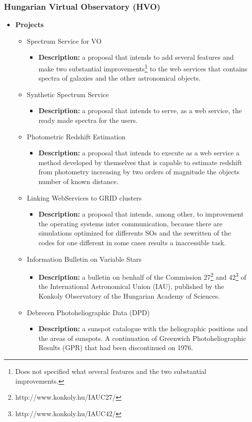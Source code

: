 \subsubsection{Hungarian Virtual Observatory \cite{website:hvo-home} (HVO)}

\begin{itemize}
\item \textbf{Projects}
\begin{itemize}
\item Spectrum Service for VO
\begin{itemize}
\item \textbf{Description:} a proposal that intends to add several features and
make two substantial improvements\footnote{Does not specified what several
features and the two substantial improvements.} to the web services that
contains spectra of galaxies and the other astronomical objects. 
\end{itemize}
\item Synthetic Spectrum Service
\begin{itemize}
\item \textbf{Description:} a proposal that intends to serve, as a web service,
the ready made spectra for the users.
\end{itemize}
\item Photometric Redshift Estimation
\begin{itemize}
\item \textbf{Description:} a proposal that intends to execute as a web service
a method developed by themselves that is capable to estimate redshift from
photometry increasing by two orders of magnitude the objects number of known
distance. 
\end{itemize}
\item Linking WebServices to GRID clusters
\begin{itemize}
\item \textbf{Description:} a proposal that intends, among other, to improvement
the operating systems inter communication, because there are simulations
optimized for differents SOs and the rewritten of the codes for one different in
some cases results a inaccessible task.
\end{itemize}
\item Information Bulletin on Variable Stars
\begin{itemize}
\item \textbf{Description:} a bulletin on benhalf of the Commission
27\footnote{http://www.konkoly.hu/IAUC27/} and
42\footnote{http://www.konkoly.hu/IAUC42/} of the International Astronomical
Union (IAU), published by the Konkoly Observatory of the Hungarian Academy of
Sciences. 
\end{itemize}
\item Debrecen Photoheliographic Data (DPD)
\begin{itemize}
\item \textbf{Description:} a sunspot catalogue with the heliographic positions
and the areas of sunspots. A continuation of Greenwich Photoheliographic
Results (GPR) that had been discontinued on 1976.
\end{itemize}
\end{itemize}
\end{itemize}

